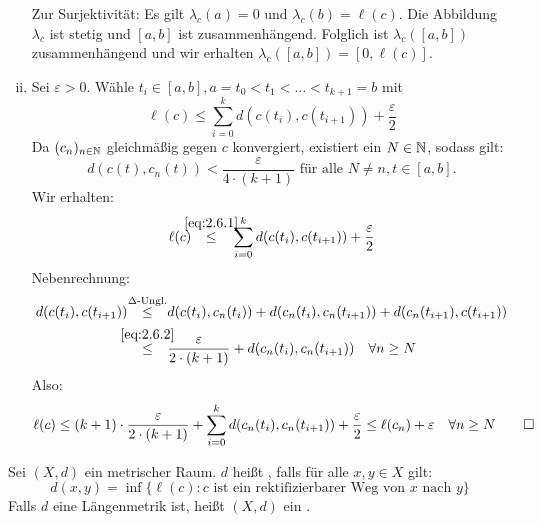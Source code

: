 \begin{beweis}
\begin{enumerate}[(i)]
		Zur Surjektivität:
		Es gilt $\lambda_c(a) = 0$ und $\lambda_c(b) = \ell(c)$.
		Die Abbildung $\lambda_c$ ist stetig und $[a,b]$ ist zusammenhängend.
		Folglich ist $\lambda_c([a,b])$ zusammenhängend und wir erhalten $\lambda_c([a,b]) = [0,\ell(c)]$. \setcounter{enumi}{6}
		\item Sei $\varepsilon >0$. 
		Wähle $t_i \in [a,b], a = t_0 < t_1 < \dots < t_{k+1} = b$ mit
		\begin{equation}
			\ell(c) \leq \sum\limits_{i=0}^{k} d(c(t_i),c(t_{i+1})) + \frac{\varepsilon}{2} \label{eq:2.6.1}
		\end{equation}
		Da $(c_n)_{n \in \mathbb{N}}$ gleichmäßig gegen $c$ konvergiert, existiert ein $N \in \mathbb{N}$, sodass gilt:
		\begin{equation}
			d(c(t),c_n(t)) < \frac{\varepsilon}{4 \cdot (k+1)} \text{ für alle } N \neq n, t \in [a,b]. \label{eq:2.6.2}
		\end{equation}
		Wir erhalten:
		\begin{equation}
			\ell(c) \stack{\eqref{eq:2.6.1}}{\leq} \sum\limits_{i=0}^{k} d(c(t_i),c(t_{i+1})) + \frac{\varepsilon}{2}
		\end{equation}
		Nebenrechnung:
		\begin{align*}
			d(c(t_i),c(t_{i+1})) &\stack{\Delta\text{-Ungl.}}{\leq} d(c(t_i),c_n(t_i)) + d(c_n(t_i),c_n(t_{i+1})) + d(c_n(t_{i+1}),c(t_{i+1})) \\
			&\stack{\eqref{eq:2.6.2}}{\leq} \frac{\varepsilon}{2 \cdot (k+1)} + d(c_n(t_i),c_n(t_{i+1})) \quad \forall n \geq N
		\end{align*}
		Also:
		\[
			\ell(c) \leq (k+1) \cdot \frac{\varepsilon}{2 \cdot (k+1)} + \sum\limits_{i=0}^{k} d(c_n(t_i),c_n(t_{i+1})) + \frac{\varepsilon}{2} \leq \ell(c_n) + \varepsilon \quad \forall n \geq N \qedhere
		\]
	\end{enumerate}
\end{beweis}

\begin{definition}
\label{def:2.7}
	Sei $(X,d)$ ein metrischer Raum.
	$d$ heißt , falls für alle $x,y \in X$ gilt:
	\[
		d(x,y) = \inf \{ \ell(c) : c \text{ ist ein rektifizierbarer Weg von } x \text{ nach } y \}
	\]
	Falls $d$ eine Längenmetrik ist, heißt $(X,d)$ ein .
\end{definition}

